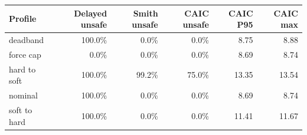 \begin{tabular}{lrrrrr}\toprule
Profile & Delayed unsafe & Smith unsafe & CAIC unsafe & CAIC P95 & CAIC max\\
\midrule
deadband & 100.0\% & 0.0\% & 0.0\% & 8.75 & 8.88\\
force cap & 0.0\% & 0.0\% & 0.0\% & 8.69 & 8.74\\
hard to soft & 100.0\% & 99.2\% & 75.0\% & 13.35 & 13.54\\
nominal & 100.0\% & 0.0\% & 0.0\% & 8.69 & 8.74\\
soft to hard & 100.0\% & 0.0\% & 0.0\% & 11.41 & 11.67\\
\bottomrule\end{tabular}
